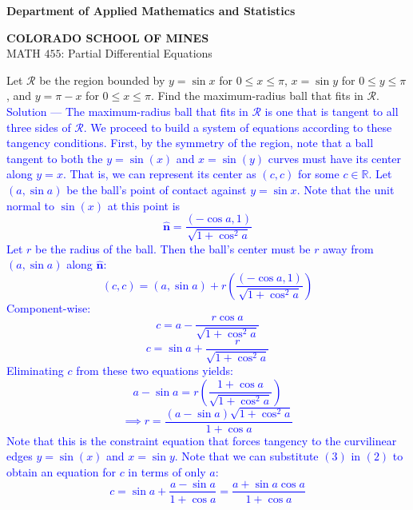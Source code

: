 \documentclass[12pt]{article}
\begin{document}
\begin{flushleft}

\textbf{Department of Applied Mathematics and Statistics}

\textbf{COLORADO SCHOOL OF MINES}\\
MATH $455$: Partial Differential Equations
\end{flushleft}

Let $\mathcal{R}$ be the region bounded by $y = \sin{x}$ for $0 \leq x \leq \pi$, $x = \sin{y}$ for $0 \leq y \leq \pi$, and $y = \pi - x$ for $0 \leq x \leq \pi$. Find the maximum-radius ball that fits in $\mathcal{R}$. \\ 

\textcolor{blue}{Solution — The maximum-radius ball that fits in $\mathcal{R}$ is one that is tangent to all three sides of $\mathcal{R}$. We proceed to build a system of equations according to these tangency conditions. First, by the symmetry of the region, note that a ball tangent to both the $y=\sin(x)$ and $x=\sin(y)$ curves must have its center along $y=x$. That is, we can represent its center as $(c,c)$ for some $c\in \mathbb{R}$. Let $(a, \sin{a})$ be the ball's point of contact against $y=\sin{x}$. Note that the unit normal to $\sin(x)$ at this point is 
$$\mathbf{\hat{n}} = \frac{(-\cos{a}, 1)}{\sqrt{1 + \cos^2 {a}}}$$ Let $r$ be the radius of the ball. Then the ball's center must be $r$ away from $(a, \sin a)$ along $\mathbf{\hat{n}}$:
$$(c,c) = (a, \sin{a}) + r \left( \frac{(-\cos{a}, 1)}{\sqrt{1 + \cos^2 {a}}} \right)$$
Component-wise:
\begin{equation}
c = a - \frac{r\cos{a}}{\sqrt{1 + \cos^2 a}}
\end{equation}
\begin{equation}
c = \sin a + \frac{r}{\sqrt{1 + \cos^2 a}}
\end{equation}
Eliminating $c$ from these two equations yields:
$$a - \sin{a} = r \left( \frac{1+\cos{a}}{\sqrt{1 + \cos^2{a}}} \right)$$
\begin{equation}
\implies r = \frac{(a - \sin a) \sqrt{1 + \cos^2{a}}}{1 + \cos a}
\end{equation}
Note that this is the constraint equation that forces tangency to the curvilinear edges $y=\sin(x)$ and $x=\sin{y}$. Note that we can substitute $(3)$ in $(2)$ to obtain an equation for $c$ in terms of only $a$:
\begin{equation}
c = \sin{a} + \frac{a - \sin{a}}{1 + \cos{a}} = \frac{a + \sin{a}\cos{a}}{1 + \cos{a}}
\end{equation}
}
\end{document}
